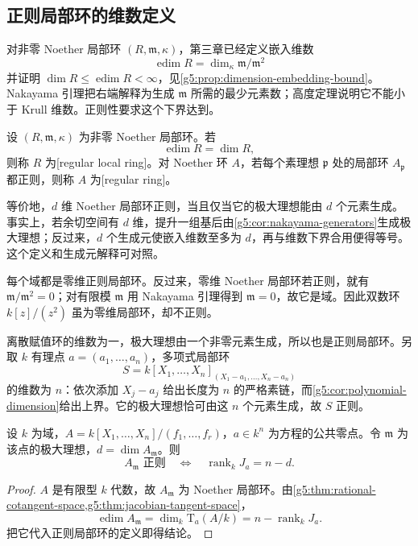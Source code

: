 \subsection{正则局部环的维数定义}
\label{g5:subsec:0503:04}

对非零 Noether 局部环 \((R,\mathfrak m,\kappa)\)，第三章已经定义嵌入维数
\[
	\operatorname{edim}R=\dim_\kappa\mathfrak m/\mathfrak m^2
\]
并证明 \(\dim R\leq\operatorname{edim}R<\infty\)，见\cref{g5:prop:dimension-embedding-bound}。Nakayama 引理把右端解释为生成 \(\mathfrak m\) 所需的最少元素数；高度定理说明它不能小于 Krull 维数。正则性要求这个下界达到。

\begin{definition}\label{g5:def:regular-local-ring}
	设 \((R,\mathfrak m,\kappa)\) 为非零 Noether 局部环。若
	\[
		\operatorname{edim}R=\dim R,
	\]
	则称 \(R\) 为[regular local ring]。对 Noether 环 \(A\)，若每个素理想 \(\mathfrak p\) 处的局部环 \(A_{\mathfrak p}\) 都正则，则称 \(A\) 为[regular ring]。
\end{definition}

等价地，\(d\) 维 Noether 局部环正则，当且仅当它的极大理想能由 \(d\) 个元素生成。事实上，若余切空间有 \(d\) 维，提升一组基后由\cref{g5:cor:nakayama-generators}生成极大理想；反过来，\(d\) 个生成元使嵌入维数至多为 \(d\)，再与维数下界合用便得等号。这个定义和生成元解释可对照\cite[第14节开头，第105页]{Matsumura1989}。

\begin{example}\label{g5:exm:basic-regular-local-rings}
	每个域都是零维正则局部环。反过来，零维 Noether 局部环若正则，就有 \(\mathfrak m/\mathfrak m^2=0\)；对有限模 \(\mathfrak m\) 用 Nakayama 引理得到 \(\mathfrak m=0\)，故它是域。因此双数环 \(k[z]/(z^2)\) 虽为零维局部环，却不正则。

	离散赋值环的维数为一，极大理想由一个非零元素生成，所以也是正则局部环。另取 \(k\) 有理点 \(a=(a_1,\ldots,a_n)\)，多项式局部环
	\[
		S=k[X_1,\ldots,X_n]_{(X_1-a_1,\ldots,X_n-a_n)}
	\]
	的维数为 \(n\)：依次添加 \(X_j-a_j\) 给出长度为 \(n\) 的严格素链，而\cref{g5:cor:polynomial-dimension}给出上界。它的极大理想恰可由这 \(n\) 个元素生成，故 \(S\) 正则。
\end{example}

\begin{corollary}\label{g5:cor:rational-jacobian-regularity}
	设 \(k\) 为域，\(A=k[X_1,\ldots,X_n]/(f_1,\ldots,f_r)\)，\(a\in k^n\) 为方程的公共零点。令 \(\mathfrak m\) 为该点的极大理想，\(d=\dim A_{\mathfrak m}\)。则
	\[
		A_{\mathfrak m}\text{ 正则}
		\quad\Longleftrightarrow\quad
		\operatorname{rank}_kJ_a=n-d.
	\]
\end{corollary}
\begin{proof}
	\(A\) 是有限型 \(k\) 代数，故 \(A_{\mathfrak m}\) 为 Noether 局部环。由\cref{g5:thm:rational-cotangent-space,g5:thm:jacobian-tangent-space}，
	\[
		\operatorname{edim}A_{\mathfrak m}
		=\dim_k \mathrm{T}_a(A/k)=n-\operatorname{rank}_kJ_a.
	\]
	把它代入正则局部环的定义即得结论。
\end{proof}

